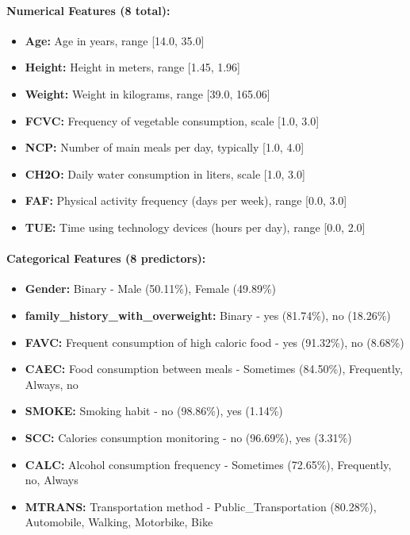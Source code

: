 \documentclass[12pt,a4paper]{article}
\begin{document}
\paragraph{Numerical Features (8 total):}
\begin{itemize}
    \item \textbf{Age:} Age in years, range [14.0, 35.0]
    \item \textbf{Height:} Height in meters, range [1.45, 1.96]
    \item \textbf{Weight:} Weight in kilograms, range [39.0, 165.06]
    \item \textbf{FCVC:} Frequency of vegetable consumption, scale [1.0, 3.0]
    \item \textbf{NCP:} Number of main meals per day, typically [1.0, 4.0]
    \item \textbf{CH2O:} Daily water consumption in liters, scale [1.0, 3.0]
    \item \textbf{FAF:} Physical activity frequency (days per week), range [0.0, 3.0]
    \item \textbf{TUE:} Time using technology devices (hours per day), range [0.0, 2.0]
\end{itemize}

\paragraph{Categorical Features (8 predictors):}
\begin{itemize}
    \item \textbf{Gender:} Binary - Male (50.11\%), Female (49.89\%)
    \item \textbf{family\_history\_with\_overweight:} Binary - yes (81.74\%), no (18.26\%)
    \item \textbf{FAVC:} Frequent consumption of high caloric food - yes (91.32\%), no (8.68\%)
    \item \textbf{CAEC:} Food consumption between meals - Sometimes (84.50\%), Frequently, Always, no
    \item \textbf{SMOKE:} Smoking habit - no (98.86\%), yes (1.14\%)
    \item \textbf{SCC:} Calories consumption monitoring - no (96.69\%), yes (3.31\%)
    \item \textbf{CALC:} Alcohol consumption frequency - Sometimes (72.65\%), Frequently, no, Always
    \item \textbf{MTRANS:} Transportation method - Public\_Transportation (80.28\%), Automobile, Walking, Motorbike, Bike
\end{itemize}
\end{document}
